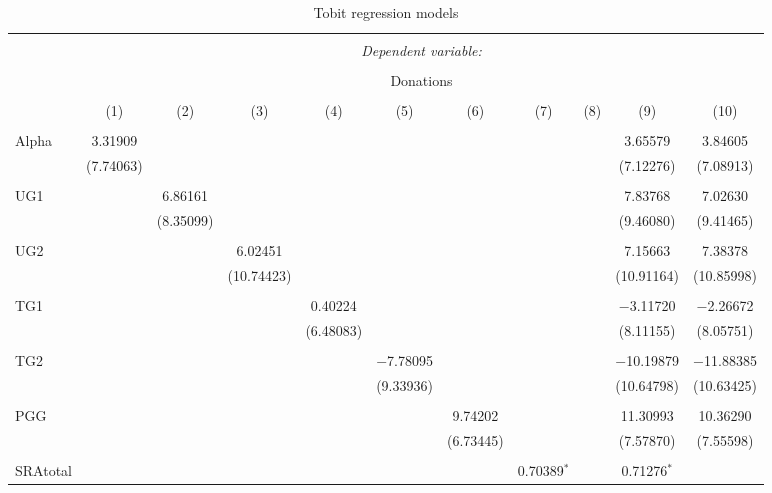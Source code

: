 \documentclass[12pt]{article}
\begin{document}
{\begin{table}[!htbp] \centering 
  \caption{Tobit regression models} 
  \label{} 
            \begin{adjustbox}{width=\textwidth}
\begin{tabular}{@{\extracolsep{5pt}}lcccccccccc} 
\\[-1.8ex]\hline 
\hline \\[-1.8ex] 
 & \multicolumn{10}{c}{\textit{Dependent variable:}} \\ 
\cline{2-11} 
\\[-1.8ex] & \multicolumn{10}{c}{Donations} \\ 
\\[-1.8ex] & (1) & (2) & (3) & (4) & (5) & (6) & (7) & (8) & (9) & (10)\\ 
\hline \\[-1.8ex] 
 Alpha & 3.31909 &  &  &  &  &  &  &  & 3.65579 & 3.84605 \\ 
  & (7.74063) &  &  &  &  &  &  &  & (7.12276) & (7.08913) \\ 
  & & & & & & & & & & \\ 
 UG1 &  & 6.86161 &  &  &  &  &  &  & 7.83768 & 7.02630 \\ 
  &  & (8.35099) &  &  &  &  &  &  & (9.46080) & (9.41465) \\ 
  & & & & & & & & & & \\ 
 UG2 &  &  & 6.02451 &  &  &  &  &  & 7.15663 & 7.38378 \\ 
  &  &  & (10.74423) &  &  &  &  &  & (10.91164) & (10.85998) \\ 
  & & & & & & & & & & \\ 
 TG1 &  &  &  & 0.40224 &  &  &  &  & $-$3.11720 & $-$2.26672 \\ 
  &  &  &  & (6.48083) &  &  &  &  & (8.11155) & (8.05751) \\ 
  & & & & & & & & & & \\ 
 TG2 &  &  &  &  & $-$7.78095 &  &  &  & $-$10.19879 & $-$11.88385 \\ 
  &  &  &  &  & (9.33936) &  &  &  & (10.64798) & (10.63425) \\ 
  & & & & & & & & & & \\ 
 PGG &  &  &  &  &  & 9.74202 &  &  & 11.30993 & 10.36290 \\ 
  &  &  &  &  &  & (6.73445) &  &  & (7.57870) & (7.55598) \\ 
  & & & & & & & & & & \\ 
 SRAtotal &  &  &  &  &  &  & 0.70389$^{*}$ &  & 0.71276$^{*}$ &  \\ 

\end{tabular}
\end{adjustbox}
\end{table}}
\end{document}
